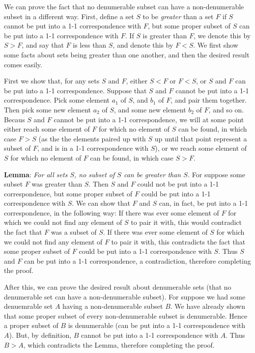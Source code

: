 \documentclass{article}
\theoremstyle{definition}
\begin{document}
We can prove the fact that no denumerable subset can have a non-denumerable subset in a different way. First, define a set $S$ to be \textit{greater} than a set $F$ if 
$S$ cannot be put into a 1-1 correspondence with $F$, but some proper subset of $S$ can be put into a 1-1 correspondence with $F$. If $S$ is greater than $F$, we denote this by $S>F$, and say that 
$F$ is less than $S$, and denote this by $F<S$. We first show some facts about sets being greater than one another, 
and then the desired result comes easily.

First we show that, for any sets $S$ and $F$, either $S<F$ or $F<S$, or $S$ and $F$ can be put into a 1-1 correspondence. Suppose that $S$ and $F$ cannot be put into a 1-1 correspondence. 
Pick some element $a_1$ of $S$, and $b_1$ of $F$, and pair them together. Then pick some new element $a_2$ of $S$, and some new element $b_2$ of $F$, and so on. Becaus $S$ and $F$ cannot be put into a 
1-1 correspondence, we will at some point either reach some element of $F$ for which no element of $S$ can be found, in which case $F>S$ (as the the elements paired up with $S$ up until that point 
represent a subset of $F$, and is in a 1-1 correspondence with $S$), or we reach some element of $S$ for which no element of $F$ can be found, in which case $S>F$. 


\textbf{Lemma}:\textit{ For all sets $S$, no subset of $S$ can be greater than $S$.}\newline 
For suppose some subset $F$ was greater than $S$. Then $S$ and $F$ could not be put into a 1-1 correspondence, but 
some proper subset of $F$ could be put into a 1-1 correspondence with $S$. We can show that $F$ and $S$ can, in fact, be put into a 1-1 correspondence, in the following way: If there was ever some 
element of $F$ for which we could not find any element of $S$ to pair it with, this would contradict the fact that $F$ was a subset of $S$. If there was ever some element of $S$ for which we could not 
find any element of $F$ to pair it with, this contradicts the fact that some proper subset of $F$ could be put into a 1-1 correspondence with $S$. Thus $S$ and $F$ can be put into a 1-1 correspondence, 
a contradiction, therefore completing the proof.


After this, we can prove the desired result about denumerable sets (that no denumerable set can have a non-denumerable subset). For suppose we had some denuemrable set $A$ having a
non-denumerable subset $B$. We have already shown that some proper subset of every non-denumerable subset is denumerable. Hence a proper subset of $B$ is denumerable (can be put into a 
1-1 correspondence with $A$). But, by definition, $B$ cannot be put into a 1-1 correspondence with $A$. Thus $B>A$, which contradicts the Lemma, therefore completing the proof.
\end{document}
